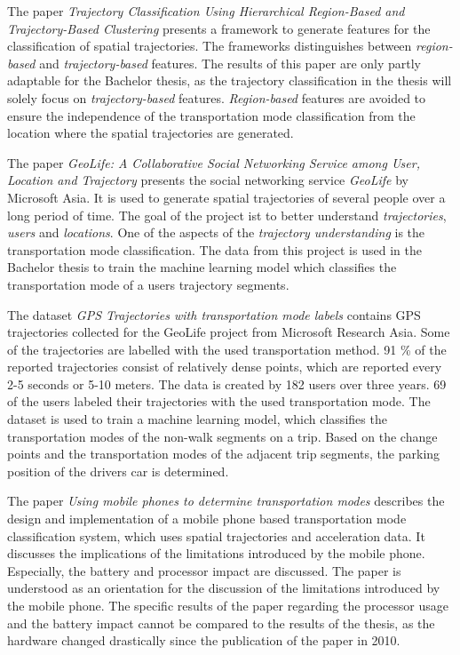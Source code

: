 The paper \textit{Trajectory Classification Using Hierarchical Region-Based and Trajectory-Based Clustering} \cite{lee2008traclass} presents a framework to generate features for the classification of spatial trajectories. The frameworks distinguishes between \textit{region-based} and \textit{trajectory-based} features.  \newline
The results of this paper are only partly adaptable for the Bachelor thesis, as the trajectory classification in the thesis will solely focus on \textit{trajectory-based} features. \textit{Region-based} features are avoided to ensure the independence of the transportation mode classification from the location where the spatial trajectories are generated.

The paper \textit{GeoLife: A Collaborative Social Networking Service among User, Location and Trajectory} \cite{zheng2010geolife} presents the social networking service \textit{GeoLife} by Microsoft Asia. It is used to generate spatial trajectories of several people over a long  period of time. The goal of the project ist to better understand \textit{trajectories}, \textit{users} and \textit{locations}. One of the aspects of the \textit{trajectory understanding} is the transportation mode classification.
The data from this project is used in the Bachelor thesis to train the machine learning model which classifies the transportation mode of a users trajectory segments.

The dataset \textit{GPS Trajectories with transportation mode labels} \cite{geolife-dataset}\cite{zheng2009mining}\cite{zheng2008understanding}\cite{zheng2010geolife} contains GPS trajectories collected for the GeoLife project from Microsoft Research Asia. Some of the trajectories are labelled with the used transportation method. 91 \% of the reported trajectories consist of relatively dense points, which are reported every 2-5 seconds or 5-10 meters. The data is created by 182 users over three years. 69 of the users labeled their trajectories with the used transportation mode. \newline
The dataset is used to train a machine learning model, which classifies the transportation modes of the non-walk segments on a trip. Based on the change points and the transportation modes of the adjacent trip segments, the parking position of the drivers car is determined. 


The paper \textit{Using mobile phones to determine transportation modes} \cite{Reddy2010} describes the design and implementation of a mobile phone based transportation mode classification system, which uses spatial trajectories and acceleration data. It discusses the implications of the limitations introduced by the mobile phone. Especially, the battery and processor impact are discussed.
The paper is understood as an orientation for the discussion of the limitations introduced by the mobile phone. The specific results of the paper regarding the processor usage and the battery impact cannot be compared to the results of the thesis, as the hardware changed drastically since the publication of the paper in 2010.

